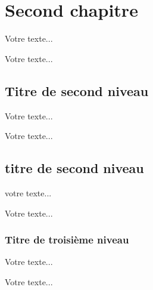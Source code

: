 
\newpage

\section{Second chapitre}

Votre texte...

Votre texte...

\subsection{Titre de second niveau}

Votre texte...

Votre texte...

\subsection{titre de second niveau}
 
votre texte...
 
Votre texte...

\subsubsection{Titre de troisième niveau}
 
Votre texte...
 
Votre texte...

